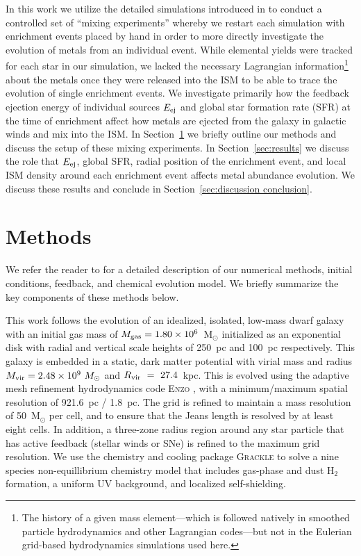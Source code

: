 \documentclass[twocolumn]{aastex62}
\begin{document}
In this work we utilize the detailed simulations introduced in \cite{Emerick2019} to conduct a controlled set of ``mixing experiments'' whereby we restart each simulation with enrichment events placed by hand in order to more directly investigate the evolution of metals from an individual event. While elemental yields were tracked for each star in our simulation, we lacked the necessary Lagrangian information\footnote{The history of a given mass element---which is followed natively in smoothed particle hydrodynamics and other Lagrangian codes---but not in the Eulerian grid-based hydrodynamics simulations used here.} about the metals once they were released into the ISM to be able to trace the evolution of single enrichment events. We investigate primarily how the feedback ejection energy of individual sources $E_{\rm ej}$ and global star formation rate (SFR) at the time of enrichment affect how metals are ejected from the galaxy in galactic winds and mix into the ISM. In Section~\ref{sec:methods} we briefly outline our methods and discuss the setup of these mixing experiments. In Section~\ref{sec:results} we discuss the role that $E_{\rm ej}$, global SFR, radial position of the enrichment event, and local ISM density around each enrichment event affects metal abundance evolution. We discuss these results and conclude in Section~\ref{sec:discussion conclusion}.


\section{Methods}
\label{sec:methods}
We refer the reader to \cite{Emerick2019} for a detailed description of our numerical methods, initial conditions, feedback, and chemical evolution model. We briefly summarize the key components of these methods below.

This work follows the evolution of an idealized, isolated, low-mass dwarf galaxy with an initial gas mass of $M_{\rm gas} = 1.80 \times 10^6$~M$_{\odot}$ initialized as an exponential disk with radial and vertical scale heights of 250~pc and 100~pc respectively. This galaxy is embedded in a static, \cite{Burkert1995} dark matter potential with virial mass and radius $M_{\rm vir} = 2.48\times 10^{9}~M_{\odot}$ and $R_{\rm vir}~=~27.4$~kpc. This is evolved using the adaptive mesh refinement hydrodynamics code \textsc{Enzo} \citep{Enzo2014}, with a minimum/maximum spatial resolution of 921.6~pc / 1.8~pc. The grid is refined to maintain a mass resolution of 50~M$_{\odot}$ per cell, and to ensure that the Jeans length is resolved by at least eight cells. In addition, a three-zone radius region around any star particle that has active feedback (stellar winds or SNe) is refined to the maximum grid resolution. We use the chemistry and cooling package \textsc{Grackle} \citep{GrackleMethod} to solve a nine species non-equillibrium chemistry model that includes gas-phase and dust H$_2$ formation, a uniform UV background, and localized self-shielding. 
\end{document}
